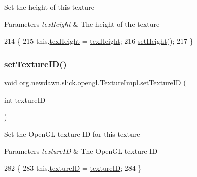 Set the height of this texture


\begin{DoxyParams}{Parameters}
{\em tex\+Height} & The height of the texture \\
\hline
\end{DoxyParams}

\begin{DoxyCode}
214                                                 \{
215         this.\mbox{\hyperlink{classorg_1_1newdawn_1_1slick_1_1opengl_1_1_texture_impl_afa18dcc63658ee42ca8f6a2822f18c1d}{texHeight}} = \mbox{\hyperlink{classorg_1_1newdawn_1_1slick_1_1opengl_1_1_texture_impl_afa18dcc63658ee42ca8f6a2822f18c1d}{texHeight}};
216         \mbox{\hyperlink{classorg_1_1newdawn_1_1slick_1_1opengl_1_1_texture_impl_a8a0e3f81daf28807c80daac7e3927808}{setHeight}}();
217     \}
\end{DoxyCode}
\mbox{\label{classorg_1_1newdawn_1_1slick_1_1opengl_1_1_texture_impl_a776b00222b3ba2c3e05483ca925c382c}} 
\subsubsection{\texorpdfstring{set\+Texture\+I\+D()}{setTextureID()}}
{\footnotesize\ttfamily void org.\+newdawn.\+slick.\+opengl.\+Texture\+Impl.\+set\+Texture\+ID (\begin{DoxyParamCaption}\item[{int}]{texture\+ID }\end{DoxyParamCaption})\hspace{0.3cm}{\ttfamily [inline]}}

Set the Open\+GL texture ID for this texture


\begin{DoxyParams}{Parameters}
{\em texture\+ID} & The Open\+GL texture ID \\
\hline
\end{DoxyParams}

\begin{DoxyCode}
282                                             \{
283         this.\mbox{\hyperlink{classorg_1_1newdawn_1_1slick_1_1opengl_1_1_texture_impl_a6dba48b815f4fc5a37e9c4390f349c9e}{textureID}} = \mbox{\hyperlink{classorg_1_1newdawn_1_1slick_1_1opengl_1_1_texture_impl_a6dba48b815f4fc5a37e9c4390f349c9e}{textureID}};
284     \}
\end{DoxyCode}
\mbox{\label{classorg_1_1newdawn_1_1slick_1_1opengl_1_1_texture_impl_a5bc77da717bc19ad2bfff9c873919719}} 
